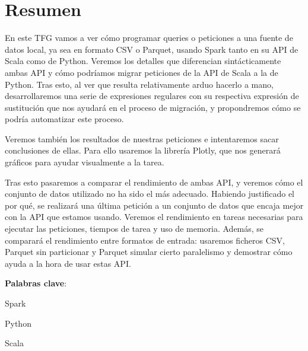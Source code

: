 \documentclass[12pt,twoside,titlepage]{report}
\newcommand\blankpage{%
    \newpage
    \null
    \thispagestyle{empty}%
    \newpage}
\begin{document}
\afterpage{\blankpage}








\chapter*{Resumen}

En este TFG vamos a ver cómo programar queries o peticiones a una fuente de datos local, ya sea en formato CSV o Parquet, usando Spark tanto en su API de Scala como de Python. Veremos los detalles que diferencian sintácticamente ambas API y cómo podríamos migrar peticiones de la API de Scala a la de Python. Tras esto, al ver que resulta relativamente arduo hacerlo a mano, desarrollaremos una serie de expresiones regulares con su respectiva expresión de sustitución que nos ayudará en el proceso de migración, y propondremos cómo se podría automatizar este proceso.

Veremos también los resultados de nuestras peticiones e intentaremos sacar conclusiones de ellas. Para ello usaremos la librería Plotly, que nos generará gráficos para ayudar visualmente a la tarea.

Tras esto pasaremos a comparar el rendimiento de ambas API, y veremos cómo el conjunto de datos utilizado no ha sido el más adecuado. Habiendo justificado el por qué, se realizará una última petición a un conjunto de datos que encaja mejor con la API que estamos usando. Veremos el rendimiento en tareas necesarias para ejecutar las peticiones, tiempos de tarea y uso de memoria. Además, se comparará el rendimiento entre formatos de entrada: usaremos ficheros CSV, Parquet sin particionar y Parquet simular cierto paralelismo y demostrar cómo ayuda a la hora de usar estas API.

\mbox{} \bigskip

\noindent \textbf{Palabras clave}:
\begin{compactitem}
    \item Spark
    \item Python
    \item Scala
\end{compactitem}

\afterpage{\blankpage}

\end{document}

